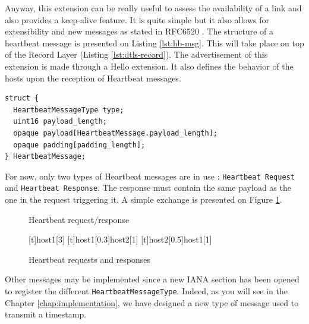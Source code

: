 Anyway, this extension can be really useful to assess the availability of a link and also provides a keep-alive feature. It is quite simple but it also allows for extensibility and new messages as stated in RFC6520 \cite{rfc6520}. The structure of a heartbeat message is presented on Listing \ref{lst:hb-msg}. This will take place on top of the Record Layer (Listing \ref{lst:dtls-record}). The advertisement of this extension is made through a Hello extension. It also defines the behavior of the hosts upon the reception of Heartbeat messages.

\begin{lstlisting}[caption=Heartbeat message, label=lst:hb-msg]
struct {
  HeartbeatMessageType type;
  uint16 payload_length;
  opaque payload[HeartbeatMessage.payload_length];
  opaque padding[padding_length];
} HeartbeatMessage;
\end{lstlisting}

For now, only two types of Heartbeat messages are in use : \texttt{Heartbeat Request} and \texttt{Heartbeat Response}. The response must contain the same payload as the one in the request triggering it. A simple exchange is presented on Figure \ref{fig:heartbeat}.

\begin{figure}[!ht]
\centering
\begin{msc}[r]{Heartbeat request/response}

\setlength{\instfootheight}{0em}
\setlength{\instheadheight}{0em}
\setlength{\instdist}{0.7\linewidth}
\setlength{\levelheight}{3em}


[t]{}{host1}[3]
\nextlevel
{}[t]{host1}[0.3]{host2}[1]
\nextlevel
{}[t]{host2}[0.5]{host1}[1]
\nextlevel
\nextlevel
\end{msc}
\caption{Heartbeat requests and responses}
\label{fig:heartbeat}
\end{figure}

Other messages may be implemented since a new IANA section has been opened to register the different \texttt{HeartbeatMessageType}. Indeed, as you will see in the Chapter \ref{chap:implementation}, we have designed a new type of message used to transmit a timestamp.
